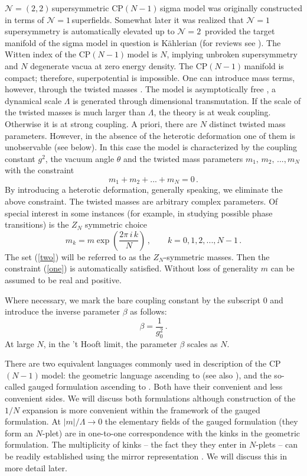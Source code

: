 \documentclass[epsfig,12pt]{article}
\def\beq{\begin{equation}}
\def\eeq{\end{equation}}
\newcommand{\ntwo}{${\mathcal N}=2\,$}
\newcommand{\none}{${\mathcal N}=1\,$}
\newcommand{\ntt}{${\mathcal N}=(2,2)\,$}
\newcommand{\cpn}{CP$(N-1)\,$}
\def\beq{\begin{equation}}
\def\eeq{\end{equation}}
\begin{document}
\ntt supersymmetric \cpn sigma model was originally constructed 
\cite{orco}
in terms of \none superfields. Somewhat later it was realized \cite{Bruno}
that 
\none supersymmetry is automatically elevated up to \ntwo
provided the target manifold of the sigma model in question is K\"ahlerian (for reviews see \cite{rev1,rev2}).
The Witten index \cite{WI} of the \cpn model is $N$, implying unbroken supersymmetry
and $N$ degenerate vacua at zero energy density.
The \cpn manifold is compact; therefore, superpotential is impossible.
One can introduce mass terms, however, through the twisted masses \cite{twisted}.
The model is asymptotically free \cite{BelPo}, a dynamical scale $\Lambda$ is generated through dimensional transmutation. If the scale of the twisted masses is much larger than $\Lambda$, the theory is at weak coupling.
Otherwise it is at strong coupling. A priori, there are $N$ distinct twisted mass parameters.
However, in the absence of the heterotic deformation one of them is unobservable
(see below). In this case the model is characterized by the coupling constant $g^2$,
the vacuum angle $\theta$ and the twisted mass parameters $m_1,\,m_2,\, ..., m_N$
with the constraint
\beq
m_1 + m_2 + ... +m_N =0\,.
\label{one}
\eeq
By introducing a heterotic deformation, generally speaking, we eliminate the above constraint.
The twisted masses are arbitrary complex parameters. Of special interest 
in some instances (for example, in studying possible phase transitions)
is the $Z_N$ symmetric choice
\beq
m_k = m\exp\left(\frac{2\pi \,i\, k}{N}\right)\,,\qquad k = 0,1,2, ... ,N-1\,.
\label{two}
\eeq
The set (\ref{two}) will be referred to as the $Z_N$-symmetric masses.
Then the constraint
(\ref{one}) is automatically satisfied. Without loss of generality $m$ can be assumed
to be real and positive. 

Where necessary, we mark the bare coupling constant by the subscript 0 and introduce
the inverse parameter $\beta$ as follows:
\beq
\beta = \frac{1}{g_0^2}\,.
\eeq
At large $N$, in the 't Hooft limit,  the parameter $\beta$ scales as $N$.

There are two equivalent languages commonly used in description of the \cpn model:
the geometric language ascending to \cite{Bruno} (see also \cite{rev2}), and the
so-called gauged formulation ascending to \cite{W79,W93}. Both have their convenient and less convenient sides.
We will discuss both formulations although construction of the $1/N$ expansion is
more convenient within the framework of the gauged formulation. At $|m|/\Lambda \to 0$
the elementary fields of the
gauged formulation (they form an  $N$-plet) are in one-to-one correspondence with the kinks in the geometric formulation.
The multiplicity of kinks -- the fact they they enter in $N$-plets --
can be readily established \cite{adam} using the mirror representation \cite{MR1}. We will discuss this in more detail
later. 
\end{document}
